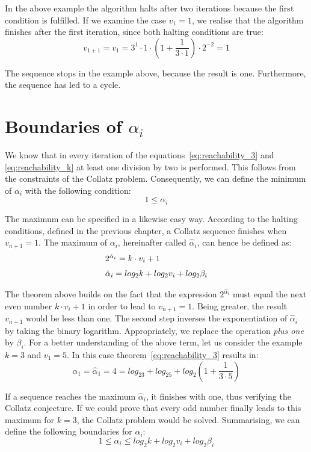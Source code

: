 \documentclass{SciPress_2015}
\begin{document}
In the above example the algorithm halts after two iterations because the first condition is fulfilled. If we examine the case $v_1=1$, we realise that the algorithm finishes after the first iteration, since both halting conditions are true:
\[
v_{1+1}=v_1=3^1\cdot 1\cdot\left(1+\frac{1}{3\cdot1}\right)\cdot2^{-2}=1
\]

The sequence stops in the example above, because the result is one. Furthermore, the sequence has led to a cycle.

\section{Boundaries of \boldmath$\alpha_i$}
We know that in every iteration of the equations~\ref{eq:reachability_3} and \ref{eq:reachability_k} at least one division by two is performed. This follows from the constraints of the Collatz problem. Consequently, we can define the minimum of $\alpha_i$ with the following condition:
\[
1\le\alpha_i
\]

The maximum can be specified in a likewise easy way. According to the halting conditions, defined in the previous chapter, a Collatz sequence finishes when $v_{n+1}=1$. The maximum of $\alpha_i$, hereinafter called $\hat\alpha_i$, can hence be defined as:
\begin{equation}
\label{eq:alpha_max}
\begin{array}{l}
2^{\hat\alpha_i}=k\cdot v_i+1\\[\medskipamount]
\hat\alpha_i=log_2k+log_2v_i+log_2\beta_i
\end{array}	
\end{equation}

The theorem above builds on the fact that the expression $2^{\hat\alpha_i}$ must equal the next even number $k\cdot v_i+1$ in order to lead to $v_{n+1}=1$. Being greater, the result $v_{n+1}$ would be less than one. The second step inverses the exponentiation of $\hat\alpha_i$ by taking the binary logarithm. Appropriately, we replace the operation \textit{plus one} by $\beta_i$. For a better understanding of the above term, let us consider the example $k=3$ and $v_1=5$. In this case theorem~\ref{eq:reachability_3} results in:
\[
\alpha_1=\hat\alpha_1=4=log_23+log_25+log_2\left(1+\frac{1}{3\cdot5}\right)
\]

If a sequence reaches the maximum $\hat\alpha_i$, it finishes with one, thus verifying the Collatz conjecture. If we could prove that every odd number finally leads to this maximum for $k=3$, the Collatz problem would be solved. Summarising, we can define the following boundaries for $\alpha_i$:
\begin{equation}
\label{eq:boundary_alpha_i}
1\le\alpha_i\le log_2k+log_2v_i+log_2\beta_i
\end{equation}
\end{document}
